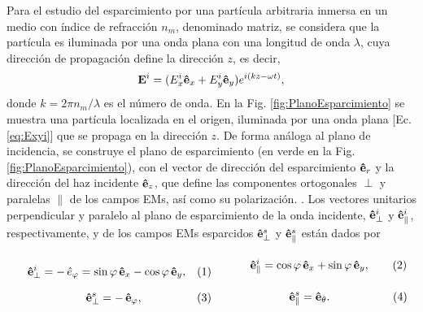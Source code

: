 Para  el estudio del esparcimiento por una partícula arbitraria inmersa en un medio con índice de refracción $n_m$, denominado  matriz, se considera que la partícula es iluminada por una onda plana con una longitud de onda $\lambda$, cuya dirección de propagación define la dirección $z$, es decir,
	\begin{align}
	\vb{E}^i = (E_x^i \vu{e}_x + E_y^i \vu{e}_y)e^{i(k z - \omega t)},
	\label{eq:Exyi}
	\end{align}
donde $k = 2\pi n_m /\lambda$ es el número de onda. En la Fig.  \ref{fig:PlanoEsparcimiento} se muestra  una partícula localizada en el origen,  iluminada por una onda plana [Ec. \eqref{eq:Exyi}] que se propaga en la dirección $z$. De forma análoga al plano de incidencia, se construye el plano de esparcimiento (en verde en la Fig. \ref{fig:PlanoEsparcimiento}), con el vector de dirección del esparcimiento $\vu{e}_r$ y la dirección del haz incidente $\vu{e}_z$, que define las componentes ortogonales $\perp$ y paralelas $\parallel$ de los campos EMs, así como su polarización.  . Los vectores unitarios perpendicular y paralelo al plano de esparcimiento de la onda incidente, $\vu{e}_{\perp}^i$  y $\vu{e}_{\parallel}^i$, respectivamente, y de los campos EMs esparcidos $\vu{e}_{\perp}^s$ y $\vu{e}_{\parallel}^s$ están dados por%
\begin{subequations} \index{Polarización!respecto al plano de esparcimiento!paralela ($\parallel$)}\index{Polarización!respecto al plano de esparcimiento!perpendicular ($\perp$)}\vspace*{-1em}

	\eqhalf{\vu{e}_{\perp}^i =-\, \hat{e}_\varphi  = \sin\varphi\,\vu{e}_x - \cos\varphi\,\vu{e}_y,}	
	\eqhalf{\vu{e}_{\parallel}^i = \cos\varphi\,\vu{e}_x + \sin\varphi\,\vu{e}_y,}	
	\label{eqs:vecInc}\end{subequations}	\begin{subequations}
	\eqhalf{\vu{e}_{\perp}^s= - \, \vu{e}_\varphi,}	
	\eqhalf{\vu{e}_{\parallel}^s = \vu{e}_\theta.}	
	\label{eqs:vecScat}\end{subequations}\vspace*{-1em}

